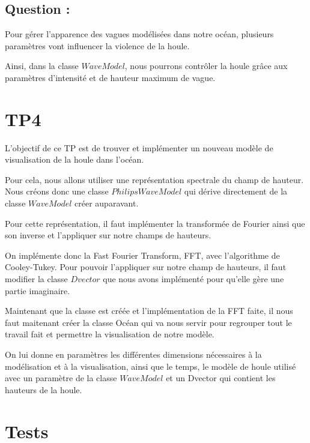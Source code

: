 \documentclass{article}
\begin{document}
\vspace{0.5cm}

\subsection*{Question :}

Pour gérer l'apparence des vagues modélisées dans notre océan, plusieurs paramètres vont influencer la violence de la houle.

Ainsi, dans la classe $WaveModel$, nous pourrons contrôler la houle grâce aux paramètres d'intensité et de hauteur maximum de vague.

\vspace{1cm}

\section{TP4}

L'objectif de ce TP est de trouver et implémenter un nouveau modèle de visualisation de la houle dans l'océan.

Pour cela, nous allons utiliser une représentation spectrale du champ de hauteur. Nous créons donc une classe $PhilipsWaveModel$ qui dérive directement de la classe $WaveModel$ créer auparavant.

Pour cette représentation, il faut implémenter la transformée de Fourier ainsi que son inverse et l'appliquer sur notre champs de hauteurs.

On implémente donc la Fast Fourier Transform, FFT, avec l'algorithme de Cooley-Tukey. Pour pouvoir l'appliquer sur notre champ de hauteurs, il faut modifier la classe $Dvector$ que nous avons implémenté pour qu'elle gère une partie imaginaire.


Maintenant que la classe est créée et l'implémentation de la FFT faite, il nous faut maitenant créer la classe Océan qui va nous servir pour regrouper tout le travail fait et permettre la visualisation de notre modèle.

On lui donne en paramètres les différentes dimensions nécessaires à la modélisation et à la visualisation, ainsi que le temps, le modèle de houle utilisé avec un paramètre de la classe $WaveModel$ et un Dvector qui contient les hauteurs de la houle.

\vspace{1cm}

\section{Tests}
\end{document}
